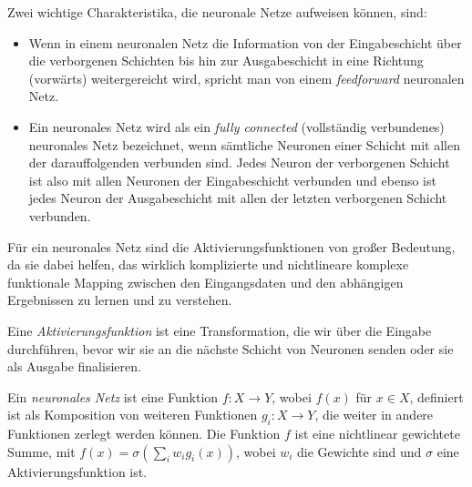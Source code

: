 %        
%        
%        
%        
%        
%    
%    
Zwei wichtige Charakteristika, die neuronale Netze aufweisen können, sind:
\begin{itemize}
\item Wenn in einem neuronalen Netz die Information von der Eingabeschicht über die verborgenen Schichten bis hin zur Ausgabeschicht in eine Richtung (\glqq vorwärts\grqq) weitergereicht wird, spricht man von einem \textit{feedforward} neuronalen Netz.
\item Ein neuronales Netz wird als ein \textit{fully connected} (\glqq vollständig verbundenes\grqq\@) neuronales Netz bezeichnet, wenn sämtliche Neuronen einer Schicht mit allen der darauffolgenden verbunden sind. Jedes Neuron der verborgenen Schicht ist also mit allen Neuronen der Eingabeschicht verbunden und ebenso ist jedes Neuron der Ausgabeschicht mit allen der letzten verborgenen Schicht verbunden.
\end{itemize}
Für ein neuronales Netz sind die Aktivierungsfunktionen von großer Bedeutung, da sie dabei helfen, das wirklich komplizierte und nichtlineare komplexe funktionale Mapping zwischen den Eingangsdaten und den abhängigen Ergebnissen zu lernen und zu verstehen.
\begin{defn}
Eine \emph{Aktivierungsfunktion} ist eine Transformation, die wir über die Eingabe durchführen, bevor wir sie an die nächste Schicht von Neuronen senden oder sie als Ausgabe finalisieren.
\end{defn}
\begin{defn}
Ein \emph{neuronales Netz} ist eine Funktion $f\colon X \to Y$, wobei $f(x)$ für $x \in X$, definiert ist als Komposition von weiteren Funktionen $g_i \colon X \to Y$, die weiter in andere Funktionen zerlegt werden können.
Die Funktion $f$ ist eine nichtlinear gewichtete Summe, mit $f(x) =  \sigma(\sum_iw_ig_i(x))$, wobei $w_i$ die Gewichte sind und $\sigma$ eine Aktivierungsfunktion ist.
\end{defn}
